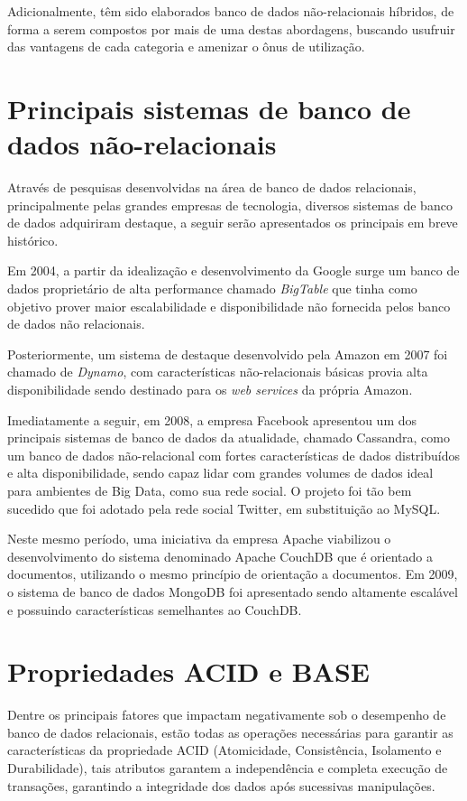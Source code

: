 \documentclass[12pt]{article}
\begin{document}
Adicionalmente, têm sido elaborados banco de dados não-relacionais híbridos, de forma a serem compostos por mais de uma destas abordagens, buscando usufruir das vantagens de cada categoria e amenizar o ônus de utilização. 

\section{Principais sistemas de banco de dados não-relacionais}
\label{sec:sistemas}

Através de pesquisas desenvolvidas na área de banco de dados relacionais, principalmente pelas grandes empresas de tecnologia, diversos sistemas de banco de dados adquiriram destaque, a seguir serão apresentados os principais em breve histórico.

Em 2004, a partir da idealização e desenvolvimento da Google surge um banco de dados proprietário de alta performance chamado \textit{BigTable} que tinha como objetivo prover maior escalabilidade e disponibilidade não fornecida pelos banco de dados não relacionais.\cite{brito2010bancos}

Posteriormente, um sistema de destaque desenvolvido pela Amazon em 2007 foi chamado de \textit{Dynamo}, com características não-relacionais básicas provia alta disponibilidade sendo destinado para os \textit{web services} da própria Amazon.\cite{brito2010bancos}

Imediatamente a seguir, em 2008, a empresa Facebook apresentou um dos principais sistemas de banco de dados da atualidade, chamado Cassandra, como um banco de dados não-relacional com fortes características de dados distribuídos e alta disponibilidade, sendo capaz lidar com grandes volumes de dados ideal para ambientes de Big Data, como sua rede social. O projeto foi tão bem sucedido que foi adotado pela rede social Twitter, em substituição ao MySQL.\cite{brito2010bancos}

Neste mesmo período, uma iniciativa da empresa Apache viabilizou o desenvolvimento do sistema denominado Apache CouchDB que é orientado a documentos, utilizando o mesmo princípio  de orientação a documentos. Em 2009, o sistema de banco de dados MongoDB foi apresentado sendo altamente escalável e possuindo características semelhantes ao CouchDB.\cite{brito2010bancos}

\section{Propriedades ACID e BASE}
\label{sect:acid}
Dentre os principais fatores que impactam negativamente sob o desempenho de banco de dados relacionais, estão todas as operações necessárias para garantir as características da propriedade ACID (Atomicidade, Consistência, Isolamento e Durabilidade), tais atributos garantem a independência e completa execução de transações, garantindo a integridade dos dados após sucessivas manipulações.\cite{brito2010bancos}
\end{document}
